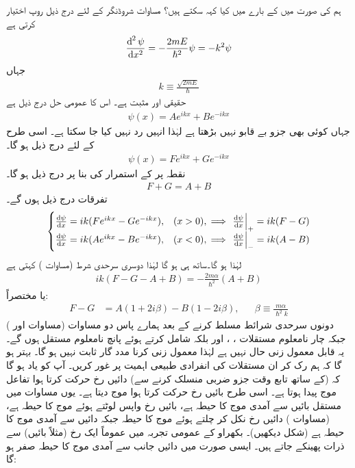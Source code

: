 ہم  کی صورت میں  کے بارے میں کیا کہہ سکتے ہیں؟ مساوات شروڈنگر  کے لئے درج ذیل روپ اختیار کرتی ہے
\begin{align*}
\frac{\dif^{\,2}\psi}{\dif x^2}=-\frac{2mE}{\hslash^2}\psi=-k^2\psi
\end{align*}
 جہاں
\begin{align}\label{مساوات_شروڈنگر_مستقل_کے}
k\equiv\frac{\sqrt{2mE}}{\hslash}
\end{align}
 حقیقی اور مثبت ہے۔ اس کا عمومی حل درج ذیل ہے
\begin{align}\label{مساوات_شروڈنگر_بایاں_حل_ڈیلٹا}
\psi(x)=Ae^{ikx}+Be^{-ikx}
\end{align}
جہاں کوئی بھی جزو بے قابو نہیں بڑھتا ہے لہٰذا انہیں رد نہیں کیا جا سکتا ہے۔ اسی طرح  کے لئے درج ذیل ہو گا۔
\begin{align}\label{مساوات_شروڈنگر_دایاں_حل_ڈیلٹا}
\psi(x)=Fe^{ikx}+Ge^{-ikx}
\end{align}
نقطہ  پر  کے استمرار کی بنا پر درج ذیل ہو گا۔
\begin{align}\label{مساوات_شروڈنگر_شرط_اول}
F+G=A+B
\end{align}
تفرقات درج ذیل ہوں گے۔
\begin{align*}
\begin{cases}
\frac{\dif\psi}{\dif x}=ik(Fe^{ikx}-Ge^{-ikx}),& (x>0),\implies \left.\frac{\dif\psi}{\dif x}\right|_{+}=ik(F-G)\\
\frac{\dif\psi}{\dif x}=ik(Ae^{ikx}-Be^{-ikx}),& (x<0),\implies \left.\frac{\dif\psi}{\dif x}\right|_{-}=ik(A-B)
\end{cases}
\end{align*}
لہٰذا  ہو گا۔ساتھ ہی  ہو گا لہٰذا دوسری سرحدی شرط (مساوات ) کہتی ہے
\begin{align}
ik(F-G-A+B)=-\frac{2m\alpha}{\hslash^2}(A+B)
\end{align}
یا مختصراً:
\begin{align}\label{مساوات_شروڈنگر_شرط_دوم}
F-G&=A(1+2i\beta)-B(1-2i\beta),&&\beta\equiv\frac{m\alpha}{\hslash^2 k}
\end{align}
دونوں سرحدی شرائط مسلط کرنے کے بعد ہمارے پاس دو مساوات (مساوات  اور ) جبکہ چار نامعلوم مستقلات ، ،  اور  بلکہ  شامل کرتے ہوئے پانچ نامعلوم مستقل ہوں گے۔ یہ قابل  معمول زنی   حال نہیں ہے لہٰذا معمول زنی کرنا   مدد گار ثابت نہیں ہو گا۔ بہتر ہو گا کہ ہم رک کر ان مستقلات کی انفرادی طبیعی اہمیت پر غور کریں۔ آپ کو یاد ہو گا کہ  (کے ساتھ تابع وقت جزو ضربی  منسلک کرنے سے) دائیں رخ حرکت کرتا ہوا تفاعل موج پیدا ہوتا ہے۔ اسی طرح  بائیں رخ حرکت کرتا ہوا موج دیتا ہے۔ یوں مساوات  میں مستقل  بائیں سے آمدی موج کا حیطہ ہے،  بائیں رخ واپس لوٹتے ہوئے موج کا حیطہ ہے،  (مساوات ) دائیں رخ نکل کر چلتے ہوئے موج کا حیطہ جبکہ  دائیں سے آمدی موج کا حیطہ ہے (شکل  دیکھیں)۔ بکھراو کے عمومی تجربہ میں عموماً ایک رخ (مثلاً بائیں) سے ذرات پھینکے جاتے ہیں۔ ایسی صورت میں دائیں جانب سے آمدی موج کا حیطہ صفر ہو گا:
